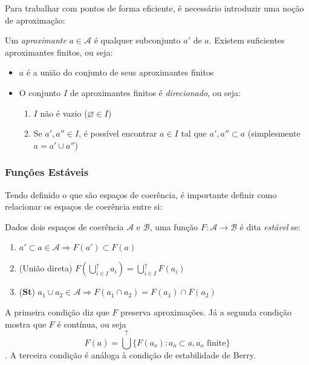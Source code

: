 \documentclass[../main.tex]{subfiles}
\begin{document}
Para trabalhar com pontos de forma eficiente, é necessário introduzir uma noção de aproximação:

\begin{definition}
    Um \emph{aproximante} $a \in \mathcal{A}$ é qualquer subconjunto $a'$ de $a$. Existem suficientes aproximantes finitos, ou seja:
    \begin{itemize}
        \item $a$ é a união do conjunto de seus aproximantes finitos
        \item O conjunto $I$ de aproximantes finitos é \emph{direcionado}, ou seja:
        \begin{enumerate}
            \item $I$ não é vazio ($\varnothing \in I$)
            \item Se $a', a'' \in I$, é possível encontrar $a \in I$ tal que $a', a'' \subset a$ (simplesmente $a = a' \cup a''$)
        \end{enumerate}
    \end{itemize}
\end{definition}

\subsubsection{Funções Estáveis}

Tendo definido o que são espaços de coerência, é importante definir como relacionar os espaços de coerência entre si:

\begin{definition}
    Dados dois espaços de coerência $\mathcal{A}$ e $\mathcal{B}$, uma função $F : \mathcal{A} \to \mathcal{B}$ é dita \emph{estável} se:
    \begin{enumerate}
        \item $a' \subset a \in \mathcal{A} \Rightarrow F(a') \subset F(a)$
        \item (União direta) $F(\bigcup_{i \in I}^{\uparrow} a_i) = \bigcup_{i \in I}^{\uparrow} F(a_i)$
        \item (\textbf{St}) $a_1 \cup a_2 \in \mathcal{A} \Rightarrow F(a_1 \cap  a_2) = F(a_1) \cap F(a_2)$
    \end{enumerate}
\end{definition}

A primeira condição diz que $F$ preserva aproximações. Já a segunda condição mostra que $F$ é contínua, ou seja $$F(a) = \bigcup^{\uparrow} \{ F(a_o) : a_o \subset a, a_o \text{ finite} \}$$. A terceira condição é análoga à condição de estabilidade de Berry. 
\end{document}
